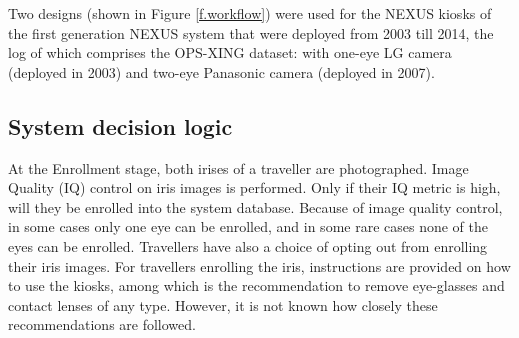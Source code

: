 \documentclass{cta-author}%
\newcommand{\cmt}[1]{}
\begin{document}
Two designs (shown in Figure \ref{f.workflow}) 
were used for the NEXUS kiosks of the  first generation NEXUS system that were deployed from 2003 till 2014, the log of which comprises the OPS-XING dataset: with one-eye LG camera (deployed in 2003) and 
two-eye Panasonic camera (deployed in 2007). 

\cmt{
Three designs used for the NEXUS kiosks are shown in Figure \ref{f.kiosks}:  with one-eye LG camera (used from 2003 till 2007) and two-eye Panasonic camera (used from 2007 till 2014) 
and  with IrisID cameras installed in 2014 for the second generation systems that are presently deployed. 
The key difference of the second generation from the first generation is the use of the travel document to initiate 1-to-1 verification and the use of two different kiosk heights to better accommodate travellers of different heights.
}




\subsection{System decision logic}

At the Enrollment stage, both irises of a traveller are photographed. Image Quality (IQ) control on iris images is performed. Only if their IQ metric is high, will they be enrolled into the system database. Because of image quality control, in some cases only one eye can be enrolled, and in some rare cases none of the eyes can be enrolled.
Travellers have also a choice of opting out from enrolling their iris images. %
For travellers enrolling the iris, instructions are provided on how to use the kiosks, among which is the recommendation to remove eye-glasses and contact lenses of any type.  However, it is not known  how closely these recommendations are followed. 
\end{document}
